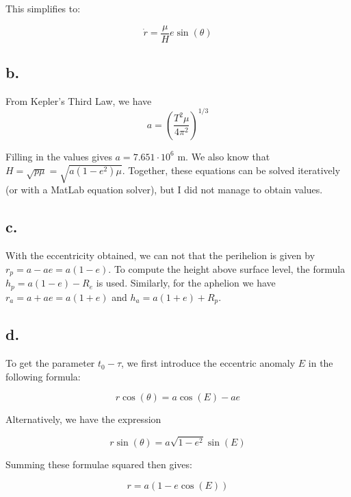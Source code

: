 This simplifies to:

\begin{equation}
    \dot{r} = \frac{\mu}{H}e \sin{(\theta)}
\end{equation}

\subsection*{b.}
From Kepler's Third Law, we have 
\begin{equation}
    a = (\frac{T^2 \mu}{4 \pi^2})^{1/3}
\end{equation}

Filling in the values gives $a = 7.651 \cdot 10^6$ m. We also know that $H = \sqrt{p \mu} = \sqrt{a(1-e^2) \mu}$. Together, these equations can be solved iteratively (or with a MatLab equation solver), but I did not manage to obtain values.


\subsection*{c.}
With the eccentricity obtained, we can not that the perihelion is given by $r_p = a - ae = a(1-e)$. To compute the height above surface level, the formula $h_p = a(1-e) - R_e$ is used.
Similarly, for the aphelion we have $r_a = a + ae = a(1+e)$ and $h_a = a(1+e) + R_p$.


\subsection*{d.}
To get the parameter $t_0 - \tau$, we first introduce the eccentric anomaly $E$ in the following formula:

\begin{equation}
    r \cos{(\theta)} = a\cos{(E)} - ae
\end{equation}

Alternatively, we have the expression

\begin{equation}
    r \sin{(\theta)} = a \sqrt{1-e^2} \sin{(E)}
\end{equation}

Summing these formulae squared then gives:

\begin{equation}
    r = a (1-e\cos{(E)})
\end{equation}

